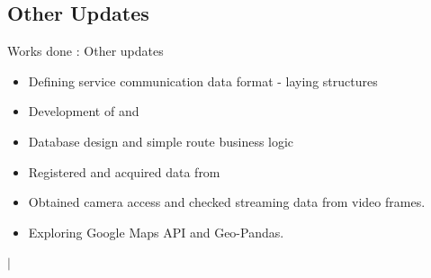 \documentclass{beamer}
\newcommand{\link}[2]{\href{#1}{\textit{\color{blue}{#2}}}}%
\begin{document}
	\subsection{Other Updates}
	\begin{frame}{Works done : Other updates}
		\begin{itemize}
			\item Defining service communication data format - laying structures \link{https://github.com/Project-Dragon-Fly/mock-servers/blob/main/data\_format.md}{visit here}
			\item Development of \link{https://github.com/Project-Dragon-Fly/backend-server}{backend service} and \link{https://github.com/Project-Dragon-Fly/mock-servers}{mock servers}
			\item Database design and simple route business logic 
			\item Registered and acquired data from \link{https://www.aicitychallenge.org/}{NVIDIA AI City Challenge}
			\item Obtained camera access and checked streaming data from video frames.
			\item Exploring Google Maps API and Geo-Pandas.
		\end{itemize}
		\begin{center}
			\link{https://github.com/Project-Dragon-Fly}{GitHub Organization} $|$ \link{https://drive.google.
				com/drive/folders/1GbQ1L1mfY97nh3NXE4Iyz\_e2gIwvmH0V?usp=sharing}{Shared Google Drive}
		\end{center}
	\end{frame}

\end{document}
